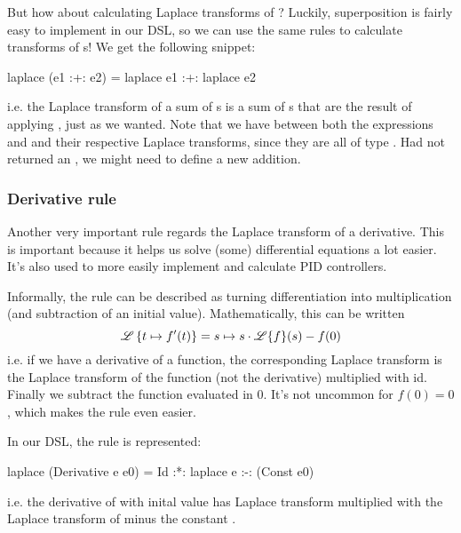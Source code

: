 But how about calculating Laplace transforms of ? 
Luckily, superposition is fairly easy to implement in our DSL, so we can use the
same rules to calculate transforms of s!
We get the following snippet: 
\begin{code}
laplace (e1 :+: e2) = laplace e1 :+: laplace e2 
\end{code}
i.e. the Laplace transform of a sum of s is a sum of
s that are the result of applying , just as we
wanted. 
Note that we have \cmd{:+:} between both the expressions  and 
and their respective Laplace transforms, since they are all of type
. Had  not returned an , we might
need to define a new addition. 


\subsubsection{Derivative rule}
Another very important rule regards the Laplace transform of a derivative. This
is important because it helps us solve (some) differential equations a lot
easier. It's also used to more easily implement and calculate PID controllers.

Informally, the rule can be described as turning differentiation into
multiplication (and subtraction of an initial value). 
Mathematically, this can be written
\begin{equation*}
  \mathscr{L}\left\{t \mapsto f'(t)\right\} = s \mapsto s \cdot \mathscr{L}\{f\}(s) - f(0)
\end{equation*}
i.e. if we have a derivative of a function, the corresponding Laplace transform
is the Laplace transform of the function (not the derivative) multiplied with
id. Finally we subtract the function evaluated in 0. It's not uncommon for $f(0)
= 0$, which makes the rule even easier. 
 
In our DSL, the rule is represented:
\begin{code}
laplace (Derivative e e0) = Id :*: laplace e :-: (Const e0) 
\end{code}
i.e. the derivative of  with inital value  has Laplace transform  multiplied
with the Laplace transform of  minus the constant .

